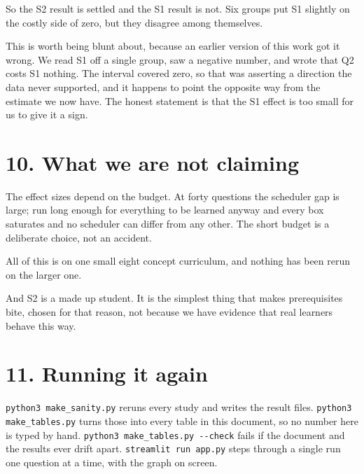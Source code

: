 \documentclass[11pt]{article}
\newcommand{\code}[1]{\texttt{\small #1}}
\begin{document}


\noindent So the S2 result is settled and the S1 result is not. Six groups
put S1 slightly on the costly side of zero, but they disagree among
themselves.

This is worth being blunt about, because an earlier version of this work
got it wrong. We read S1 off a single group, saw a negative number, and
wrote that Q2 costs S1 nothing. The interval covered zero, so that was
asserting a direction the data never supported, and it happens to point
the opposite way from the estimate we now have. The honest statement is
that the S1 effect is too small for us to give it a sign.

\section*{10. What we are not claiming}

The effect sizes depend on the budget. At forty questions the scheduler
gap is large; run long enough for everything to be learned anyway and
every box saturates and no scheduler can differ from any other. The short
budget is a deliberate choice, not an accident.

All of this is on one small eight concept curriculum, and nothing has been
rerun on the larger one.

And S2 is a made up student. It is the simplest thing that makes
prerequisites bite, chosen for that reason, not because we have evidence
that real learners behave this way.

\section*{11. Running it again}

\code{python3 make\_sanity.py} reruns every study and writes the result
files. \code{python3 make\_tables.py} turns those into every table in this
document, so no number here is typed by hand.
\code{python3 make\_tables.py -{}-check} fails if the document and the
results ever drift apart. \code{streamlit run app.py} steps through a single run one question
at a time, with the graph on screen.
\end{document}
